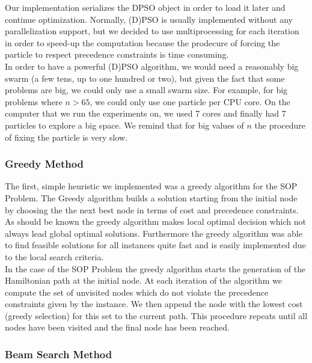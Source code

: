 \documentclass[]{article}
\begin{document}
	Our implementation serializes the DPSO object in order to load it later and continue optimization. Normally, (D)PSO is usually implemented 
	without any parallelization support, but we decided to use multiprocessing for each iteration in order to speed-up the computation because the 
	prodecure of forcing the particle to respect precedence constraints is time consuming. \\
	
	In order to have a powerful (D)PSO algorithm, we would need a reasonably big swarm (a few tens, up to one hundred or two), but given the fact 
	that some problems are big, we could only use a small swarm size. For example, for big problems where $ n > 65 $, we could only use one particle 
	per CPU core. On the computer that we run the experiments on, we used 7 cores and finally had 7 particles to explore a big space. We remind that 
	for big values of $ n $ the procedure of fixing the particle is very slow.
	
    \subsubsection{Greedy Method}

   	The first, simple heuristic we implemented was a greedy algorithm for the SOP Problem. The Greedy algorithm builds a solution starting from the initial node by choosing the the next best node in terms of cost and precedence constraints. As should be known the greedy algorithm makes local optimal decision which not always lead global optimal solutions. Furthermore the greedy algorithm was able to find feasible solutions for all instances quite fast and is easily implemented due to the local search criteria. \cite{Cormen2009} \\

   	In the case of the SOP Problem the greedy algorithm starts the generation of the Hamiltonian path at the initial node. At each iteration of the 
   	algorithm we compute the set of unvisited nodes which do not violate the precedence constraints given by the instance. We then append the node 
   	with the lowest cost (greedy selection) for this set to the current path. This procedure repeats until all nodes have been visited and the final 
   	node has been reached.

    \subsubsection{Beam Search Method}
\end{document}
